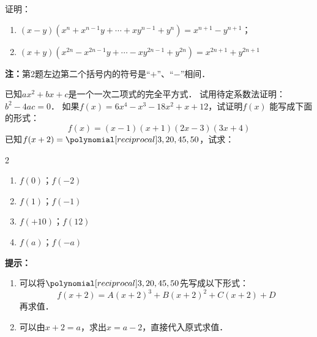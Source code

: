 \begin{enumerate}
\staritem 证明：
\begin{enumerate}
    \item $(x-y)(x^n+x^{n-1}y+\cdots +xy^{n-1}+y^n)=x^{n+1}-y^{n+1}$；
    \item $(x+y)(x^{2n}-x^{2n-1}y+\cdots -xy^{2n-1}+y^{2n})=x^{2n+1}+y^{2n+1}$
\end{enumerate}
\textbf{注：}第2题左边第二个括号内的符号是“$+$”、“$-$”相间．

\staritem  已知$ax^2+bx+c$是一个一次二项式的完全平方式．
试用待定系数法证明：$b^2-4ac=0$．
\staritem  如果$f(x)=6x^4-x^3-18x^2+x+12$，试证明$f(x)$
能写成下面的形式：
\[f(x)=(x-1)(x+1)(2x-3)(3x+4)\]
\staritem 已知$f(x+2)=\poly{3,20,45,50}$，试求：
    \begin{multicols}{2}
\begin{enumerate}
    \item $f(0)$；$f(-2)$
    \item $f(1)$；$f(-1)$
    \item $f(+10)$；$f(12)$
    \item $f(a)$；$f(-a)$
\end{enumerate}
\end{multicols}
\textbf{提示：}
\begin{enumerate}
    \item 可以将$\poly{3,20,45,50}$先写成以下形式：
    \[f(x+2)=A(x+2)^3+B(x+2)^2+C(x+2)+D\]
    再求值．
    \item 可以由$x+2=a$，求出$x=a-2$，直接代入原式求值．
\end{enumerate}

\end{enumerate}


